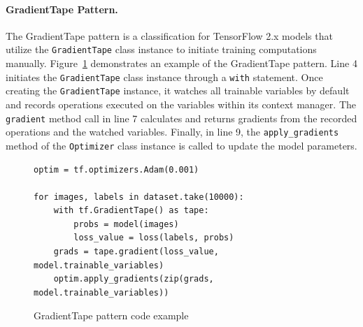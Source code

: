 
\paragraph{GradientTape Pattern.}
The GradientTape pattern is a classification for TensorFlow 2.x models that
utilize the {\tt GradientTape} class instance to initiate training computations
manually.
Figure~\ref{fig:tapepattern} demonstrates an example of the
GradientTape pattern. 
Line 4 initiates the {\tt GradientTape} class instance through a {\tt with}
statement. 
Once creating the {\tt GradientTape} instance, it watches all trainable
variables by default and records operations executed on the variables within
its context manager.
The {\tt gradient} method call in line 7 calculates and returns gradients from
the recorded operations and the watched variables. 
Finally, in line 9, the {\tt apply\_gradients} method of the {\tt Optimizer}
class instance is called to update the model parameters.


\begin{figure}[!ht]
  \begin{lstlisting}[style=mpython]
optim = tf.optimizers.Adam(0.001)

for images, labels in dataset.take(10000):
    with tf.GradientTape() as tape:
        probs = model(images)
        loss_value = loss(labels, probs)
    grads = tape.gradient(loss_value, model.trainable_variables)
    optim.apply_gradients(zip(grads, model.trainable_variables))\end{lstlisting}
  \caption{GradientTape pattern code example}
  \label{fig:tapepattern}
\end{figure}

